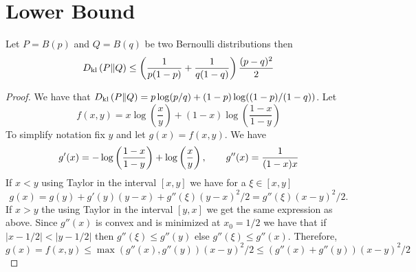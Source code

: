 \section{Lower Bound}
\begin{lemma}
  Let $P=B(p)$ and $Q=B(q)$ be two Bernoulli distributions then
  \[
    D_{\mathrm{kl}} \left(P\|Q\right) \leq
    \left(\frac{1}{p (1-p)} + \frac{1}{q (1-q)} \right) \frac{(p - q)^2}{2}
  \]

\end{lemma}
\begin{proof}
  We have that
  \(
    D_{\mathrm{kl}} \left(P\|Q\right) = p \log (p/q) + (1-p) \log((1-p)/(1-q))
  \).
  Let
  \[
    f(x,y) =
    x \log\left(\frac{x}{y}\right) +
    (1-x) \log\left(\frac{1-x}{1-y}\right)
  \]
  To simplify notation fix $y$ and  let $g(x) = f(x,y)$.  We have
  \begin{align*}
    g'(x) = - \log\left(\frac{1-x}{1-y}\right) + \log\left(\frac{x}{y}\right),
    \qquad g''(x) = \frac{1}{(1-x)x}
  \end{align*}
  If $x < y$ using Taylor in the interval $[x,y]$ we have for a $\xi \in [x,y]$
  \[
    g(x) = g(y) + g'(y)(y-x) + g''(\xi) (y-x)^2/2 = g''(\xi) (x-y)^2/2.
  \]
  If $x> y$ the using Taylor in the interval $[y,x]$ we get the same
  expression as above.
  Since $g''(x)$ is convex and is minimized at $x_0 = 1/2$ we have that
  if $|x-1/2| < |y-1/2|$ then $g''(\xi) \leq g''(y)$
  else $g''(\xi) \leq g''(x)$.  Therefore,
  \[
    g(x) =
    f(x,y) \leq
    \max(g''(x), g''(y))(x-y)^2/2 \leq  (g''(x) + g''(y)) (x-y)^2/2
  \]
\end{proof}

